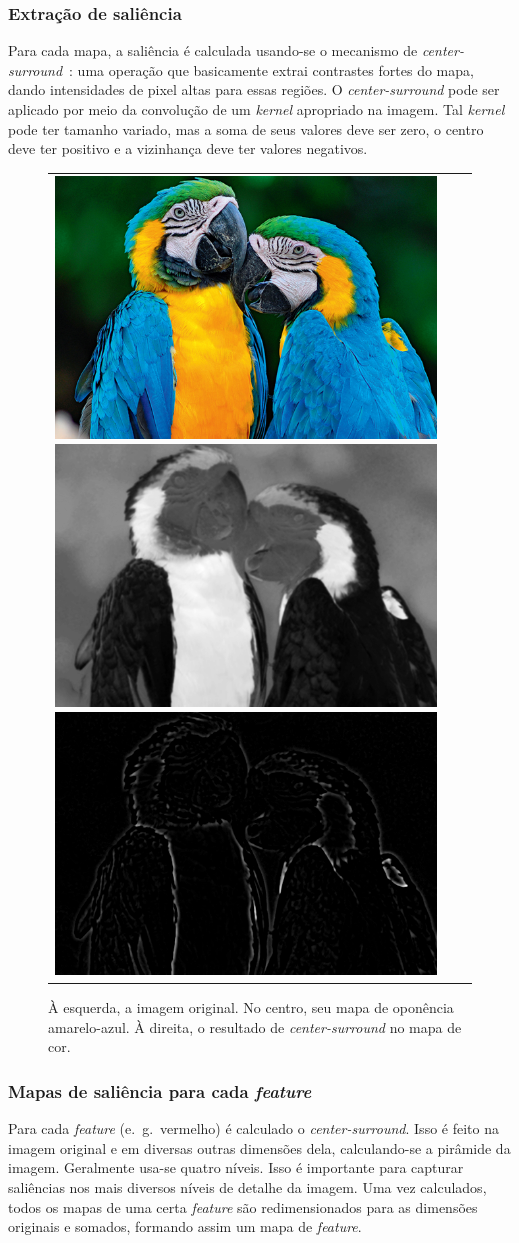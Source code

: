 \documentclass[article]{IEEEtran}
\newcommand{\tit}[1]{\textit{#1}}
\newcommand{\eg}{e.~g.~}
\begin{document}
\subsubsection{Extração de saliência}
Para cada mapa, a saliência é calculada usando-se o mecanismo de
\tit{center-surround}~\cite{Frintrop2006}:
uma operação que basicamente extrai contrastes fortes
do mapa, dando intensidades de pixel altas para essas regiões.
O \tit{center-surround} pode ser aplicado por meio da convolução de um
\tit{kernel} apropriado na imagem.
Tal \tit{kernel} pode ter tamanho variado, mas a soma de seus valores deve
ser zero, o centro deve ter positivo e a vizinhança deve ter valores
negativos.
\begin{figure}[hbt]
\begin{center}
		\begin{tabular} {ccc}
            \includegraphics[width=0.3\linewidth]{img/arara.jpg}
            \includegraphics[width=0.3\linewidth]{img/arara_y.png}
            \includegraphics[width=0.3\linewidth]{img/arara_y_cs.png}
		\end{tabular}
\end{center}
\caption{À esquerda, a imagem original. No centro, seu mapa de oponência
amarelo-azul. À direita, o resultado de \tit{center-surround}
no mapa de cor.}
\label{fig:extrfeat}
\end{figure}

\subsubsection{Mapas de saliência para cada \tit{feature}}
Para cada \tit{feature} (\eg vermelho) é calculado o \tit{center-surround}.
Isso é feito na imagem original e em diversas outras dimensões dela,
calculando-se a pirâmide da imagem. Geralmente usa-se quatro níveis.
Isso é importante para capturar saliências nos mais diversos níveis de detalhe
da imagem. Uma vez calculados, todos os mapas de uma certa \tit{feature}
são redimensionados para as dimensões originais e somados, formando assim
um mapa de \tit{feature}.
\end{document}
